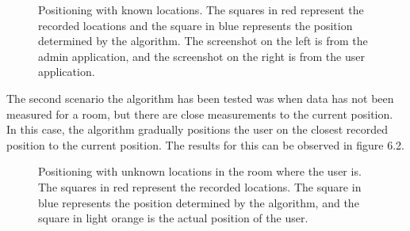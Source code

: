 \begin{figure}[H]
    \centering
    \caption{Positioning with known locations. The squares in red represent the recorded locations and the square in blue represents the position determined by the algorithm. The screenshot on the left is from the admin application, and the screenshot on the right is from the user application.}
    \label{fig:ips-known-loc}
\end{figure}

\newpage
The second scenario the algorithm has been tested was when data has not been measured for a room, but there are close measurements to the current position. In this case, the algorithm gradually positions the user on the closest recorded position to the current position. The results for this can be observed in figure 6.2.

\begin{figure}[H]
    \centering
    \caption{Positioning with unknown locations in the room where the user is. The squares in red represent the recorded locations. The square in blue represents the position determined by the algorithm, and the square in light orange is the actual position of the user. }
    \label{fig:ips-unknown-loc}
\end{figure}

